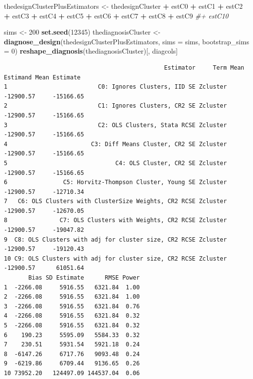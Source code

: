 \documentclass[
  12pt,
]{book}
\newenvironment{Shaded}{\begin{snugshade}}{\end{snugshade}}
\newcommand{\CommentTok}[1]{\textcolor[rgb]{0.56,0.35,0.01}{\textit{#1}}}
\newcommand{\DataTypeTok}[1]{\textcolor[rgb]{0.13,0.29,0.53}{#1}}
\newcommand{\DecValTok}[1]{\textcolor[rgb]{0.00,0.00,0.81}{#1}}
\newcommand{\KeywordTok}[1]{\textcolor[rgb]{0.13,0.29,0.53}{\textbf{#1}}}
\newcommand{\NormalTok}[1]{#1}
\newcommand{\OperatorTok}[1]{\textcolor[rgb]{0.81,0.36,0.00}{\textbf{#1}}}
\newcommand{\StringTok}[1]{\textcolor[rgb]{0.31,0.60,0.02}{#1}}
\theoremstyle{definition}
\theoremstyle{definition}
\theoremstyle{definition}
\theoremstyle{remark}
\begin{document}
\begin{Shaded}
\begin{Highlighting}[]
\NormalTok{thedesignClusterPlusEstimators <-}\StringTok{ }\NormalTok{thedesignCluster }\OperatorTok{+}
\StringTok{  }\NormalTok{estC0 }\OperatorTok{+}\StringTok{ }\NormalTok{estC1 }\OperatorTok{+}\StringTok{ }\NormalTok{estC2 }\OperatorTok{+}\StringTok{ }\NormalTok{estC3 }\OperatorTok{+}\StringTok{ }\NormalTok{estC4 }\OperatorTok{+}\StringTok{ }\NormalTok{estC5 }\OperatorTok{+}\StringTok{ }\NormalTok{estC6 }\OperatorTok{+}\StringTok{ }\NormalTok{estC7 }\OperatorTok{+}\StringTok{ }\NormalTok{estC8 }\OperatorTok{+}\StringTok{ }\NormalTok{estC9 }\CommentTok{#+ estC10}
\end{Highlighting}
\end{Shaded}

\begin{Shaded}
\begin{Highlighting}[]
\NormalTok{sims <-}\StringTok{ }\DecValTok{200}
\KeywordTok{set.seed}\NormalTok{(}\DecValTok{12345}\NormalTok{)}
\NormalTok{thediagnosisCluster <-}\StringTok{ }\KeywordTok{diagnose_design}\NormalTok{(thedesignClusterPlusEstimators, }\DataTypeTok{sims =}\NormalTok{ sims, }\DataTypeTok{bootstrap_sims =} \DecValTok{0}\NormalTok{)}
\KeywordTok{reshape_diagnosis}\NormalTok{(thediagnosisCluster)[, diagcols]}
\end{Highlighting}
\end{Shaded}

\begin{verbatim}
                                              Estimator     Term Mean Estimand Mean Estimate
1                          C0: Ignores Clusters, IID SE Zcluster     -12900.57     -15166.65
2                          C1: Ignores Clusters, CR2 SE Zcluster     -12900.57     -15166.65
3                          C2: OLS Clusters, Stata RCSE Zcluster     -12900.57     -15166.65
4                        C3: Diff Means Cluster, CR2 SE Zcluster     -12900.57     -15166.65
5                               C4: OLS Cluster, CR2 SE Zcluster     -12900.57     -15166.65
6                C5: Horvitz-Thompson Cluster, Young SE Zcluster     -12900.57     -12710.34
7   C6: OLS Clusters with ClusterSize Weights, CR2 RCSE Zcluster     -12900.57     -12670.05
8               C7: OLS Clusters with Weights, CR2 RCSE Zcluster     -12900.57     -19047.82
9  C8: OLS Clusters with adj for cluster size, CR2 RCSE Zcluster     -12900.57     -19120.43
10 C9: OLS Clusters with adj for cluster size, CR2 RCSE Zcluster     -12900.57      61051.64
       Bias SD Estimate      RMSE Power
1  -2266.08     5916.55   6321.84  1.00
2  -2266.08     5916.55   6321.84  1.00
3  -2266.08     5916.55   6321.84  0.76
4  -2266.08     5916.55   6321.84  0.32
5  -2266.08     5916.55   6321.84  0.32
6    190.23     5595.09   5584.33  0.32
7    230.51     5931.54   5921.18  0.24
8  -6147.26     6717.76   9093.48  0.24
9  -6219.86     6709.44   9136.65  0.26
10 73952.20   124497.09 144537.04  0.06
\end{verbatim}
\end{document}

